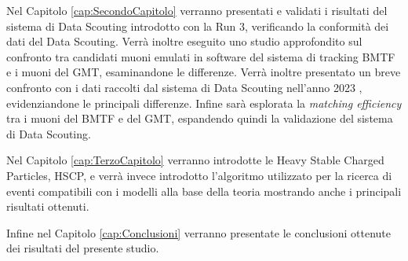 Nel Capitolo \ref{cap:SecondoCapitolo} verranno presentati e validati i risultati del sistema di Data Scouting introdotto con la Run 3, verificando la conformità dei dati del Data Scouting. Verrà inoltre eseguito uno studio approfondito sul confronto tra candidati muoni emulati in software del sistema di tracking BMTF e i muoni del GMT, esaminandone le differenze. Verrà inoltre presentato un breve confronto con i dati raccolti dal sistema di Data Scouting nell'anno 2023 \cite{CERNsummerSchool}, evidenziandone le principali differenze. Infine sarà esplorata la \textit{matching efficiency} tra i muoni del BMTF e del GMT, espandendo quindi la validazione del sistema di Data Scouting.

Nel Capitolo \ref{cap:TerzoCapitolo} verranno introdotte le Heavy Stable Charged Particles, HSCP, e verrà invece introdotto l'algoritmo utilizzato per la ricerca di eventi compatibili con i modelli alla base della teoria mostrando anche i principali risultati ottenuti.

Infine nel Capitolo \ref{cap:Conclusioni} verranno presentate le conclusioni ottenute dei risultati del presente studio. 

